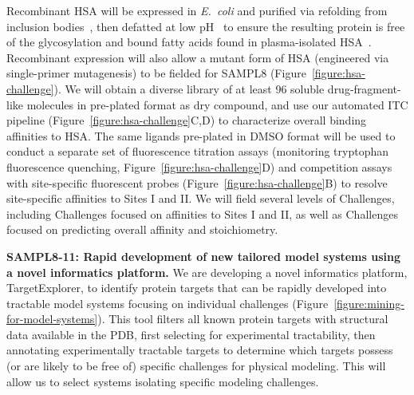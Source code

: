 \documentclass[11pt]{article}
\begin{document}
Recombinant HSA will be expressed in \emph{E.~coli} and purified via refolding from inclusion bodies~\cite{Latta:1987:Bio/Technology}, then defatted at low pH~\cite{Lang:2015:BiotechnologyProgress} to ensure the resulting protein is free of the glycosylation and bound fatty acids found in plasma-isolated HSA~\cite{Lang:2015:BiotechnologyProgress}.
Recombinant expression will also allow a mutant form of HSA (engineered via single-primer mutagenesis) to be fielded for SAMPL8 (Figure~\ref{figure:hsa-challenge}).
We will obtain a diverse library of at least 96 soluble drug-fragment-like molecules in pre-plated format as dry compound, and use our automated ITC pipeline (Figure~\ref{figure:hsa-challenge}C,D) to characterize overall binding affinities to HSA.
The same ligands pre-plated in DMSO format will be used to conduct a separate set of fluorescence titration assays (monitoring tryptophan fluorescence quenching, Figure~\ref{figure:hsa-challenge}D) and competition assays with site-specific fluorescent probes (Figure~\ref{figure:hsa-challenge}B) to resolve site-specific affinities to Sites I and II.
We will field several levels of Challenges, including Challenges focused on affinities to Sites I and II, as well as Challenges focused on predicting overall affinity and stoichiometry.

\textbf{SAMPL8-11: Rapid development of new tailored model systems using a novel informatics platform.} We are developing a novel informatics platform, TargetExplorer, to identify protein targets that can be rapidly developed into tractable model systems focusing on individual challenges (Figure~\ref{figure:mining-for-model-systems}).
This tool filters all known protein targets with structural data available in the PDB, first selecting for experimental tractability, then annotating experimentally tractable targets to determine which targets possess (or are likely to be free of) specific challenges for physical modeling.
This will allow us to select systems isolating specific modeling challenges.
\end{document}
